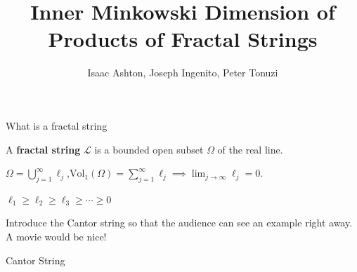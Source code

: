 \documentclass{if-beamer}
\title[]{Inner Minkowski Dimension of Products of Fractal Strings}
\subtitle{}
\author{Isaac Ashton, Joseph Ingenito, Peter Tonuzi}
\institute[]{The College of New Jersey}
\date{}
\begin{document}
\begin{frame}
  \titlepage
\end{frame}

\begin{frame}{What is a fractal string}

\begin{definition}
A {\bf fractal string} $\mathcal{L}$ is a bounded open subset $\Omega$ of the real line.
\end{definition}

\pause
\vspace{.2 in}

$\Omega = \displaystyle\bigcup_{j = 1}^\infty \ell_j$,\qquad $\displaystyle\text{Vol}_1\left(\Omega\right) = \sum_{j = 1}^\infty \ell_j \implies \lim_{j \to \infty} \ell_j = 0$.

\pause
\vspace{.2 in}

$\ell_1 \geq \ell_2 \geq \ell_3 \geq \cdots \geq 0$

\pause
\vspace{.2 in}

{\color{red} Introduce the Cantor string so that the audience can see an example right away. A movie would be nice!}

\end{frame}

\begin{frame}{Cantor String}
	\begin{center}
	\end{center}
\end{frame}
\end{document}
